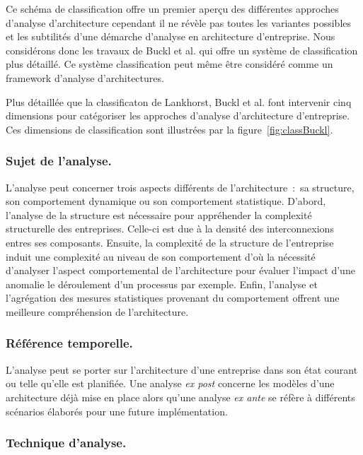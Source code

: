 Ce schéma de classification offre un premier aperçu des différentes approches
d'analyse d'architecture cependant il ne révèle pas toutes les variantes
possibles et les subtilités d'une démarche d'analyse en architecture
d'entreprise. Nous considérons donc les travaux de Buckl et al. qui offre un
système de classification plus détaillé. Ce système classification peut même
être considéré comme un framework d'analyse d'architectures.

Plus détaillée que la classificaton de Lankhorst, Buckl et al.
\cite{buckl2009classifying} font intervenir cinq dimensions pour catégoriser
les approches d'analyse d'architecture d'entreprise. Ces dimensions de
classification sont illustrées par la figure~\ref{fig:classBuckl}.



\subsubsection{Sujet de l'analyse.}

L'analyse peut concerner trois aspects différents de l'architecture~:~sa
structure, son comportement dynamique ou son comportement statistique. D'abord,
l'analyse de la structure est nécessaire pour appréhender la complexité
structurelle des entreprises. Celle-ci est due à la densité des interconnexions
entres ses composants. Ensuite, la complexité de la structure de l'entreprise
induit une complexité au niveau de son comportement d'où la nécessité
d'analyser l'aspect comportemental de l'architecture pour évaluer l'impact
d'une anomalie le déroulement d'un processus par exemple. Enfin, l'analyse et
l'agrégation des mesures statistiques provenant du comportement offrent une
meilleure compréhension de l'architecture.

\subsubsection{Référence temporelle.}

L'analyse peut se porter sur l'architecture d'une entreprise dans son état
courant ou telle qu'elle est planifiée. Une analyse \textit{ex post} concerne
les modèles d'une architecture déjà mise en place alors qu'une analyse
\textit{ex ante} se réfère à différents scénarios élaborés pour une future
implémentation.

\subsubsection{Technique d'analyse.}

